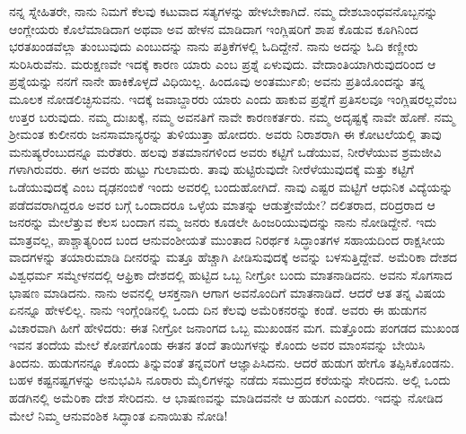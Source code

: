 ನನ್ನ ಸ್ನೇಹಿತರೇ, ನಾನು ನಿಮಗೆ ಕೆಲವು ಕಟುವಾದ ಸತ್ಯಗಳನ್ನು ಹೇಳಬೇಕಾಗಿದೆ. ನಮ್ಮ ದೇಶಬಾಂಧವನೊಬ್ಬನನ್ನು ಆಂಗ್ಲೇಯರು ಕೊಲೆಮಾಡಿದಾಗ ಅಥವಾ ಅವ ಹೇಳನ ಮಾಡಿದಾಗ ಇಂಗ್ಲಿಷರಿಗೆ ಶಾಪ ಕೊಡುವ ಕೂಗಿನಿಂದ ಭರತಖಂಡವೆಲ್ಲಾ ತುಂಬುವುದು ಎಂಬುದನ್ನು ನಾನು ಪತ್ರಿಕೆಗಳಲ್ಲಿ ಓದಿದ್ದೇನೆ. ನಾನು ಅದನ್ನು ಓದಿ ಕಣ್ಣೀರು ಸುರಿಸಿರುವೆನು. ಮರುಕ್ಷಣವೇ ಇದಕ್ಕೆ ಕಾರಣ ಯಾರು ಎಂಬ ಪ್ರಶ್ನೆ ಏಳುವುದು. ವೇದಾಂತಿಯಾಗಿರುವುದರಿಂದ ಆ ಪ್ರಶ್ನೆಯನ್ನು ನನಗೆ ನಾನೇ ಹಾಕಿಕೊಳ್ಳದೆ ವಿಧಿಯಿಲ್ಲ. ಹಿಂದೂವು ಅಂತರ್ಮುಖಿ; ಅವನು ಪ್ರತಿಯೊಂದನ್ನು ತನ್ನ ಮೂಲಕ ನೋಡಲಿಚ್ಛಿಸುವನು. ಇದಕ್ಕೆ ಜವಾಬ್ದಾರರು ಯಾರು ಎಂದು ಹಾಕುವ ಪ್ರಶ್ನೆಗೆ ಪ್ರತಿಸಲವೂ ಇಂಗ್ಲಿಷರಲ್ಲವೆಂಬ ಉತ್ತರ ಬರುವುದು. ನಮ್ಮ ದುಃಖಕ್ಕೆ, ನಮ್ಮ ಅವನತಿಗೆ ನಾವೇ ಕಾರಣಕರ್ತರು. ನಮ್ಮ ಅದೃಷ್ಟಕ್ಕೆ ನಾವೇ ಹೊಣೆ. ನಮ್ಮ ಶ‍್ರೀಮಂತ ಕುಲೀನರು ಜನಸಾಮಾನ್ಯರನ್ನು ತುಳಿಯುತ್ತಾ ಹೋದರು. ಅವರು ನಿರಾಶರಾಗಿ ಈ ಕೋಟಲೆಯಲ್ಲಿ ತಾವು ಮನುಷ್ಯ\-ರೆಂಬುದನ್ನೂ ಮರೆತರು. ಹಲವು ಶತಮಾನಗಳಿಂದ ಅವರು ಕಟ್ಟಿಗೆ ಒಡೆಯುವ, ನೀರೆಳೆಯುವ ಶ್ರಮಜೀವಿ ಗಳಾಗಿರುವರು. ಈಗ ಅವರು ಹುಟ್ಟು ಗುಲಾಮರು. ತಾವು ಹುಟ್ಟಿರುವುದೇ ನೀರೆಳೆಯುವುದಕ್ಕೆ ಮತ್ತು ಕಟ್ಟಿಗೆ ಒಡೆಯುವುದಕ್ಕೆ ಎಂಬ ದೃಢನಂಬಿಕೆ ಇಂದು ಅವರಲ್ಲಿ ಬಂದುಹೋಗಿದೆ. ನಾವು ಎಷ್ಟರ ಮಟ್ಟಿಗೆ ಆಧುನಿಕ ವಿದ್ಯೆಯನ್ನು ಪಡೆದವರಾಗಿದ್ದರೂ ಅವರ ಬಗ್ಗೆ ಒಂದಾದರೂ ಒಳ್ಳೆಯ ಮಾತನ್ನು ಆಡುತ್ತೇವೆಯೇ? ದಲಿತರಾದ, ದರಿದ್ರರಾದ ಆ ಜನರನ್ನು ಮೇಲೆತ್ತುವ ಕೆಲಸ ಬಂದಾಗ ನಮ್ಮ ಜನರು ಕೂಡಲೇ ಹಿಂಜರಿಯುವುದನ್ನು ನಾನು ನೋಡಿದ್ದೇನೆ. ಇದು ಮಾತ್ರವಲ್ಲ, ಪಾಶ್ಚಾತ್ಯರಿಂದ ಬಂದ ಆನುವಂಶೀಯತೆ ಮುಂತಾದ ನಿರರ್ಥಕ ಸಿದ್ಧಾಂತಗಳ ಸಹಾಯದಿಂದ ರಾಕ್ಷಸೀಯ ವಾದಗಳನ್ನು ತಯಾರುಮಾಡಿ ದೀನರನ್ನು ಮತ್ತೂ ಹೆಚ್ಚಾಗಿ ಪೀಡಿಸುವುದಕ್ಕೆ ಅವನ್ನು ಬಳಸುತ್ತಿದ್ದೇವೆ. ಅಮೆರಿಕಾ ದೇಶದ ವಿಶ್ವಧರ್ಮ ಸಮ್ಮೇಳನದಲ್ಲಿ ಆಫ್ರಿಕಾ ದೇಶದಲ್ಲಿ ಹುಟ್ಟಿದ ಒಬ್ಬ ನೀಗ್ರೋ ಬಂದು ಮಾತನಾಡಿದನು. ಅವನು ಸೊಗಸಾದ ಭಾಷಣ ಮಾಡಿದನು. ನಾನು ಅವನಲ್ಲಿ ಆಸಕ್ತನಾಗಿ ಆಗಾಗ ಅವನೊಂದಿಗೆ ಮಾತನಾಡಿದೆ. ಆದರೆ ಆತ ತನ್ನ ವಿಷಯ ಏನನ್ನೂ ಹೇಳಲಿಲ್ಲ. ನಾನು ಇಂಗ್ಲೆಂಡಿನಲ್ಲಿ ಒಂದು ದಿನ ಕೆಲವು ಅಮೆರಿಕನರನ್ನು ಕಂಡೆ. ಅವರು ಈ ಹುಡುಗನ ವಿಚಾರವಾಗಿ ಹೀಗೆ ಹೇಳಿದರು: ಈತ ನೀಗ್ರೋ ಜನಾಂಗದ ಒಬ್ಬ ಮುಖಂಡನ ಮಗ. ಮತ್ತೊಂದು ಪಂಗಡದ ಮುಖಂಡ ಇವನ ತಂದೆಯ ಮೇಲೆ ಕೋಪಗೊಂಡು ಈತನ ತಂದೆ ತಾಯಿಗಳನ್ನು ಕೊಂದು ಅವರ ಮಾಂಸವನ್ನು ಬೇಯಿಸಿ ತಿಂದನು. ಹುಡುಗನನ್ನೂ ಕೊಂದು ತಿನ್ನುವಂತೆ ತನ್ನವರಿಗೆ ಆಜ್ಞಾಪಿಸಿದನು. ಆದರೆ ಹುಡುಗ ಹೇಗೊ ತಪ್ಪಿಸಿಕೊಂಡನು. ಬಹಳ ಕಷ್ಟನಷ್ಟಗಳನ್ನು ಅನುಭವಿಸಿ ನೂರಾರು ಮೈಲಿಗಳನ್ನು ನಡೆದು ಸಮುದ್ರದ ಕರೆಯನ್ನು ಸೇರಿದನು. ಅಲ್ಲಿ ಒಂದು ಹಡಗಿನಲ್ಲಿ ಅಮೆರಿಕಾ ದೇಶ ಸೇರಿದನು. ಆ ಭಾಷಣವನ್ನು ಮಾಡಿದವನೇ ಆ ಹುಡುಗ ಎಂದರು. ಇದನ್ನು ನೋಡಿದ ಮೇಲೆ ನಿಮ್ಮ ಆನುವಂಶಿಕ ಸಿದ್ಧಾಂತ ಏನಾಯಿತು ನೋಡಿ!

